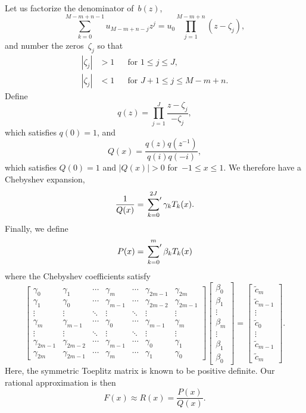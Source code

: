 \documentclass[12pt,a4paper]{article}
\begin{document}
Let us factorize the denominator of~$b(z)$,
\[
\sum_{k=0}^{M-m+n-1}u_{M-m+n-j}z^j=u_0\prod_{j=1}^{M-m+n}(z-\zeta_j),
\]
and number the zeros~$\zeta_j$ so that
\[
\begin{aligned}
|\zeta_j|&>1&&\text{for $1\le j\le J$,}\\
|\zeta_j|&<1&&\text{for $J+1\le j\le M-m+n$.}
\end{aligned}
\]
Define
\[
q(z)=\prod_{j=1}^J\frac{z-\zeta_j}{-\zeta_j},
\]
which satisfies $q(0)=1$, and
\[
Q(x)=\frac{q(z)q(z^{-1})}{q(i)q(-i)},
\]
which satisfies $Q(0)=1$ and $|Q(x)|>0$ for~$-1\le x\le 1$.  We therefore have 
a Chebyshev expansion,
\[
\frac{1}{Q(x)}=\sideset{}{'}\sum_{k=0}^{2J}\gamma_kT_k(x).
\]
Finally, we define
\[
P(x)=\sideset{}{'}\sum_{k=0}^m\beta_kT_k(x)
\]
where the Chebyshev coefficients satisfy
\[
\begin{bmatrix}
\gamma_0     &\gamma_1&\cdots&\gamma_m    &\cdots&\gamma_{2m-1}&\gamma_{2m}\\
\gamma_1     &\gamma_0&\cdots&\gamma_{m-1}&\cdots&\gamma_{2m-2}&\gamma_{2m-1}\\
\vdots       &\vdots  &\ddots&\vdots      &\ddots&\vdots       &\vdots\\
\gamma_m     &\gamma_{m-1}&\cdots&\gamma_0&\cdots&\gamma_{m-1} &\gamma_m\\
\vdots       &\vdots  &\ddots&\vdots      &\ddots&\vdots       &\vdots\\
\gamma_{2m-1}&\gamma_{2m-2}&\cdots&\gamma_{m-1}&\cdots&\gamma_0&\gamma_1\\
\gamma_{2m}  &\gamma_{2m-1}&\cdots&\gamma_m&\cdots&\gamma_1&\gamma_0
\end{bmatrix}
\begin{bmatrix}\beta_0\\ \beta_1\\ \vdots\\ \beta_m\\ \vdots\\ \beta_1\\ \beta_0
\end{bmatrix}
=\begin{bmatrix}\tilde c_m\\ \tilde c_{m-1}\\ \vdots\\ \tilde c_0\\ \vdots\\
\tilde c_{m-1}\\ \tilde c_m
 \end{bmatrix}.
\]
Here, the symmetric Toeplitz matrix is known to be positive definite.  Our 
rational approximation is then
\[
F(x)\approx R(x)=\frac{P(x)}{Q(x)}.
\]
\end{document}

